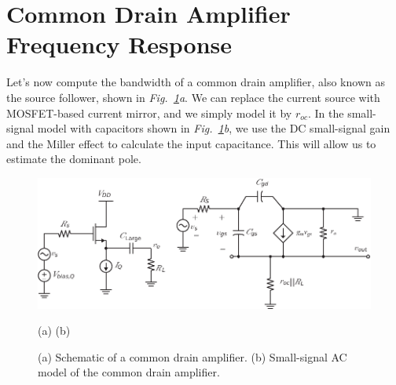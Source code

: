\newpage
\section{Common Drain Amplifier Frequency Response}
Let's now compute the bandwidth of a common drain amplifier, also known as the source follower, shown in \emph{Fig.~\ref{fig:cd_amp_ss_cap_load}a}.  We can replace the current source with MOSFET-based current mirror, and we simply model it by $r_{oc}$.  In the small-signal model with capacitors shown in \emph{Fig.~\ref{fig:cd_amp_ss_cap_load}b}, we use the DC small-signal gain and the Miller effect to calculate the input capacitance.  This will allow us to estimate the dominant pole.
\begin{figure}[H]
\centering
\includegraphics[scale=0.99]{cd_amp_ss_cap_load}\\
\raggedright \qquad \qquad \qquad \quad(a) \qquad \qquad \qquad \qquad \qquad \qquad \qquad \qquad \qquad (b)
\caption{(a) Schematic of a common drain amplifier.  (b) Small-signal AC model of the common drain amplifier.}
\label{fig:cd_amp_ss_cap_load}
\end{figure}
